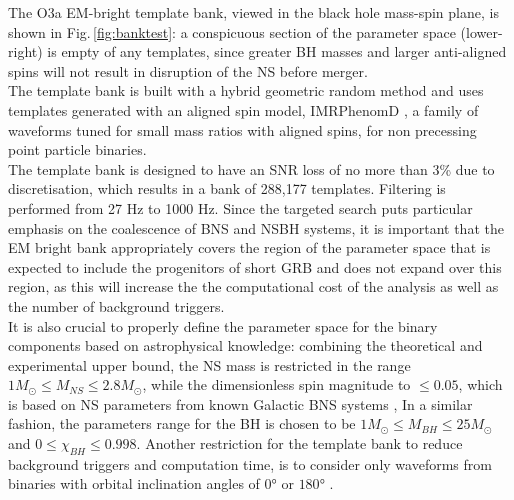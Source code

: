 \documentclass[binding=0.6cm, LaM]{sapthesis}
\begin{document}
	The O3a EM-bright template bank, viewed in the black hole mass-spin plane, is shown in Fig.\,\ref{fig:banktest}:
        a conspicuous section of the parameter space (lower-right) is empty of any templates,
        since greater BH masses and larger anti-aligned spins will not result in disruption of the NS before merger.\\ 
        The template bank is built with a hybrid geometric random method and uses templates generated with an aligned spin model,
        IMRPhenomD \cite{156}, a family of waveforms tuned for small mass ratios with aligned spins,                                                                                                        
        for non precessing point particle binaries.\\
	The template bank is designed to have an SNR loss of no more than 3\% due to discretisation, 
	which results in a bank of 288,177  templates. Filtering is performed from 27 Hz to 1000 Hz. 	
	Since the targeted search puts particular emphasis on the coalescence of  BNS and NSBH systems,
	it is important that the EM bright bank appropriately covers the region of the parameter space 
	that is expected to include the progenitors of short GRB and does not expand over this region,
	as this will increase the the computational cost of the analysis as well as the number of background triggers. \\ 
	It is also crucial to properly define the parameter space for the binary components based on astrophysical knowledge:
	combining the theoretical and experimental upper bound, the NS mass is restricted in the range $1M_\odot \leq M_{NS}  \leq 2.8M_\odot$,
	while the dimensionless spin magnitude to $\leq 0.05$, which is based on NS parameters from known Galactic BNS systems \cite{155},
       	In a similar fashion, the parameters range for the BH is chosen to be $1M_\odot \leq M_{BH}  \leq 25M_\odot$ and $0 \leq \chi_{BH} \leq 0.998$.
	Another restriction for the template bank to reduce background triggers and computation time, 
	is to consider only waveforms from binaries with orbital inclination angles of $\ang{0}$ or $\ang{180}$ \cite{46}. 
\end{document}
